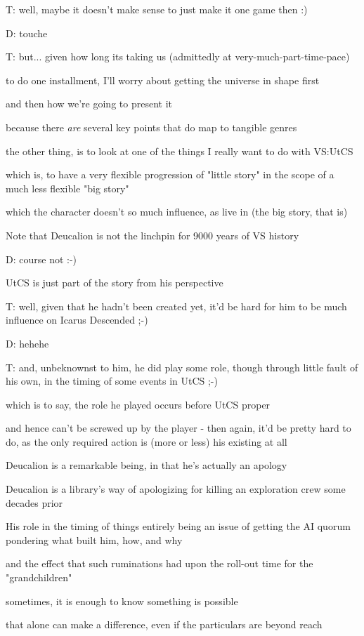 T: well, maybe it doesn't make sense to just make it one game then :)

D: touche

T: but... given how long its taking us (admittedly at very-much-part-time-pace)

to do one installment, I'll worry about getting the universe in shape first

and then how we're going to present it

because there {\em are} several key points that do map to tangible genres

the other thing, is to look at one of the things I really want to do with VS:UtCS

which is, to have a very flexible progression of "little story" in the scope of a much less flexible "big story"

which the character doesn't so much influence, as live in (the big story, that is)

Note that Deucalion is not the linchpin for 9000 years of VS history

D: course not :-)

UtCS is just part of the story from his perspective

T: well, given that he hadn't been created yet, it'd be hard for him to be much influence on Icarus Descended ;-)

D: hehehe

T: and, unbeknownst to him, he did play some role, though through little fault of his own, in the timing of some events in UtCS ;-)

which is to say, the role he played occurs before UtCS proper

and hence can't be screwed up by the player - then again, it'd be pretty hard to do, as the only required action is (more or less) his existing at all 

Deucalion is a remarkable being, in that he's actually an apology

Deucalion is a library's way of apologizing for killing an exploration crew some decades prior

His role in the timing of things entirely being an issue of getting the AI quorum pondering what built him, how, and why

and the effect that such ruminations had upon the roll-out time for the "grandchildren"

sometimes, it is enough to know something is possible

that alone can make a difference, even if the particulars are beyond reach

